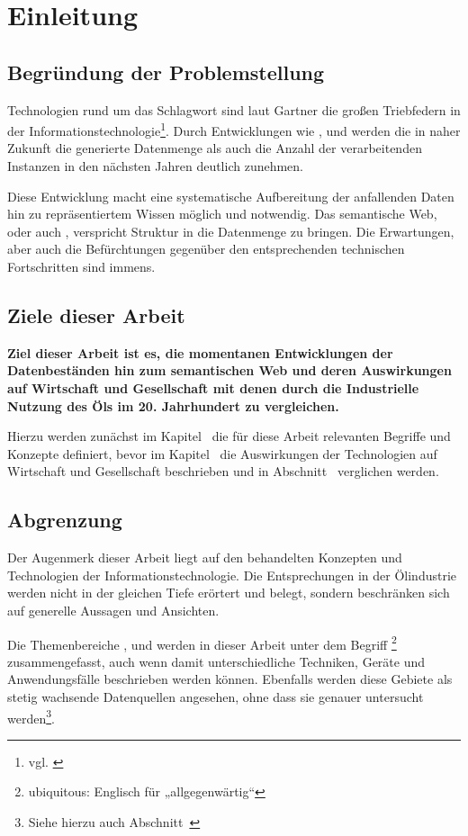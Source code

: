 \section{Einleitung}
\label{sec:einleitung}

\subsection{Begründung der Problemstellung}

Technologien rund um das Schlagwort  sind laut Gartner die großen Triebfedern in der Informationstechnologie\footnote{vgl. \cite{gartner2014}}. Durch Entwicklungen wie ,  und  werden die in naher Zukunft die generierte Datenmenge als auch die Anzahl der verarbeitenden Instanzen in den nächsten Jahren deutlich zunehmen.

Diese Entwicklung macht eine systematische Aufbereitung der anfallenden Daten hin zu repräsentiertem Wissen möglich und notwendig. Das semantische Web, oder auch , verspricht Struktur in die Datenmenge zu bringen. Die Erwartungen, aber auch die Befürchtungen gegenüber den entsprechenden technischen Fortschritten sind immens.

\subsection{Ziele dieser Arbeit}

\textbf{Ziel dieser Arbeit ist es, die momentanen Entwicklungen der Datenbeständen hin zum semantischen Web und deren Auswirkungen auf Wirtschaft und Gesellschaft mit denen durch die Industrielle Nutzung des Öls im 20. Jahrhundert zu vergleichen.}

Hierzu werden zunächst im Kapitel~ die für diese Arbeit relevanten Begriffe und Konzepte definiert, bevor im Kapitel~ die Auswirkungen der Technologien auf Wirtschaft und Gesellschaft beschrieben und in Abschnitt~ verglichen werden.

\subsection{Abgrenzung}

Der Augenmerk dieser Arbeit liegt auf den behandelten Konzepten und Technologien der Informationstechnologie. Die Entsprechungen in der Ölindustrie werden nicht in der gleichen Tiefe erörtert und belegt, sondern beschränken sich auf generelle Aussagen und Ansichten.

Die Themenbereiche ,  und  werden in dieser Arbeit unter dem Begriff \footnote{ubiquitous: Englisch für „allgegenwärtig“} zusammengefasst, auch wenn damit unterschiedliche Techniken, Geräte und Anwendungsfälle beschrieben werden können. Ebenfalls werden diese Gebiete als stetig wachsende Datenquellen angesehen, ohne dass sie genauer untersucht werden\footnote{Siehe hierzu auch Abschnitt~}.